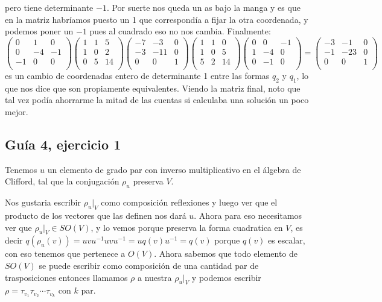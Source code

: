 \documentclass[12pt]{amsart}
\newcommand{\lp}{\left(}
\newcommand{\rp}{\right)}
\theoremstyle{plain}
\begin{document}
pero tiene determinante $-1$. Por suerte nos queda un as 
bajo la manga y es que en la matriz habríamos puesto un 1
que correspondía a fijar la otra coordenada, y podemos poner
un $-1$ pues al cuadrado eso no nos cambia. Finalmente:
$$\lp\begin{matrix}
    0&1&0 \\
    0&-4&-1 \\
    -1&0&0 \\
\end{matrix}\rp
\lp\begin{matrix}
    1&1&5 \\
    1&0&2 \\
    0&5&14 \\
\end{matrix}\rp
\lp\begin{matrix}
    -7&-3&0 \\
    -3&-11&0 \\
    0&0&1 \\
\end{matrix}\rp
\lp\begin{matrix}
    1&1&0 \\
    1&0&5 \\
    5&2&14 \\
\end{matrix}\rp
\lp\begin{matrix}
    0&0&-1 \\
    1&-4&0 \\
    0&-1&0 \\
\end{matrix}\rp = 
\lp\begin{matrix}
    -3&-1&0 \\
    -1&-23&0 \\
    0&0&1 \\
\end{matrix}\rp$$
es un cambio de coordenadas entero de determinante 1 entre
las formas $q_2$ y $q_1$, lo que nos dice que son propiamente
equivalentes. Viendo la matriz final, noto que tal vez podía 
ahorrarme la mitad de las cuentas si calculaba una solución 
un poco mejor.


\subsection*{Guía 4, ejercicio 1} Tenemos $u$ un elemento de grado 
par con inverso multiplicativo en el álgebra de Clifford, tal que 
la conjugación $\rho_u$ preserva $V$.

Nos gustaria escribir $\rho_u|_V$ como composición reflexiones y luego 
ver que el producto de los vectores que las definen nos dará $u$.
Ahora para eso necesitamos ver que $\rho_u|_V\in SO(V)$, y lo vemos 
porque preserva la forma cuadratica en $V$, es decir $q(\rho_u(v))=
uvu^{-1}uvu^{-1}=uq(v)u^{-1} =q(v)$ porque $q(v)$ es escalar, con eso
tenemos que pertenece a $O(V)$. Ahora sabemos que todo elemento
de $SO(V)$ se puede escribir como composición de una cantidad par de 
trasposiciones entonces llamamos $\rho$ a nuestra $\rho_u|_V$ y podemos
escribir $\rho=\tau_{v_1}\tau_{v_2}\cdots\tau_{v_k}$ con $k$ par.
\end{document}
